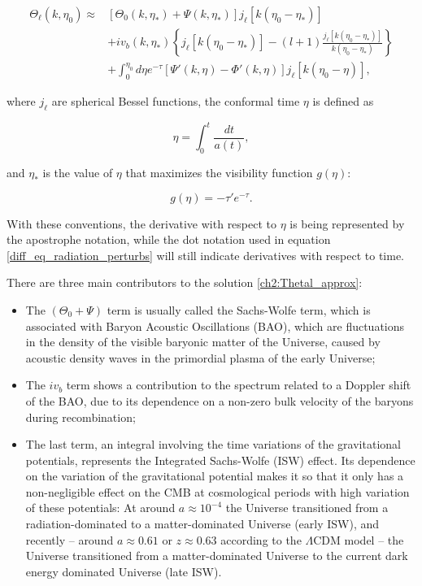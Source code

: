 \documentclass[openany,a4paper,12pt,oneside]{book}
\begin{document}
\begin{spacing}{1.5}
\begin{equation}\label{ch2:Thetal_approx}
\begin{split}
    \Theta_\ell(k,\eta_0)\approx &[\Theta_0(k,\eta_*)+\Psi(k,\eta_*)]j_\ell[k(\eta_0-\eta_*)]\\
    &+iv_b(k,\eta_*)\left\{j_\ell[k(\eta_0-\eta_*)]-(l+1)\frac{j_\ell[k(\eta_0-\eta_*)]}{k(\eta_0-\eta_*)}\right\}\\
    &+\int_0^{\eta_0} d\eta e^{-\tau}[\Psi'(k,\eta)-\Phi'(k,\eta)]j_\ell[k(\eta_0-\eta)],
\end{split}
\end{equation}

\noindent where $j_\ell$ are spherical Bessel functions, the conformal time $\eta$ is defined as

\begin{equation}\label{def:conformal_time}
    \eta=\int_0^t \frac{dt}{a(t)},
\end{equation}

\noindent and $\eta_*$ is the value of $\eta$ that maximizes the visibility function $g(\eta)$:

\begin{equation}\label{def:visibility_function}
    g(\eta)=-\tau'e^{-\tau}.
\end{equation}

With these conventions, the derivative with respect to $\eta$ is being represented by the apostrophe notation, while the dot notation used in equation \eqref{diff_eq_radiation_perturbs} will still indicate derivatives with respect to time.

There are three main contributors to the solution \eqref{ch2:Thetal_approx}:

\begin{itemize}
    \item The $(\Theta_0+\Psi)$ term is usually called the Sachs-Wolfe term, which is associated with Baryon Acoustic Oscillations (BAO), which are fluctuations in the density of the visible baryonic matter of the Universe, caused by acoustic density waves in the primordial plasma of the early Universe\cite{dodelson2020modern};
    \item The $iv_b$ term shows a contribution to the spectrum related to a Doppler shift of the BAO, due to its dependence on a non-zero bulk velocity of the baryons during recombination;
    \item The last term, an integral involving the time variations of the gravitational potentials, represents the Integrated Sachs-Wolfe (ISW) effect. Its dependence on the variation of the gravitational potential makes it so that it only has a non-negligible effect on the CMB at cosmological periods with high variation of these potentials: At around $a\approx 10^{-4}$ the Universe transitioned from a radiation-dominated to a matter-dominated Universe (early ISW), and recently -- around $a\approx 0.61$ or $z\approx 0.63$\cite{dark_energy_era} according to the $\Lambda$CDM model -- the Universe transitioned from a matter-dominated Universe to the current dark energy dominated Universe (late ISW). 
\end{itemize}


\end{spacing}
\end{document}

